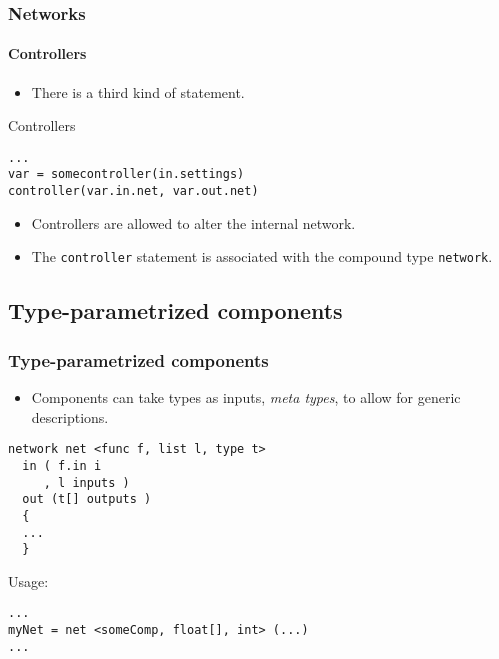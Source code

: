 \begin{frame}[fragile]
\frametitle{Networks}
\framesubtitle{Controllers}

\begin{itemize}\pause
\item There is a third kind of statement.
\end{itemize}

\pause
\begin{block}{Controllers}
\begin{verbatim}
...
var = somecontroller(in.settings)
controller(var.in.net, var.out.net)
\end{verbatim}
\end{block}


\begin{itemize}\pause
\item Controllers are allowed to alter the internal network.\pause

\item The \verb|controller| statement is associated with the compound
  type \verb|network|.
\end{itemize}
\end{frame}


\subsection*{Type-parametrized components}
\begin{frame}[shrink=4,fragile]
\frametitle{Type-parametrized components}

\begin{itemize}\pause
\item Components can take types as inputs, \emph{meta types}, to allow for
  generic descriptions.
\end{itemize}

\pause

\begin{example}
\begin{verbatim}
network net <func f, list l, type t>
  in ( f.in i
     , l inputs )
  out (t[] outputs )
  {
  ...
  }
\end{verbatim}
\end{example}

\pause

\begin{block}{Usage:}
\begin{verbatim}
...
myNet = net <someComp, float[], int> (...)
...
\end{verbatim}
\end{block}
\end{frame}
